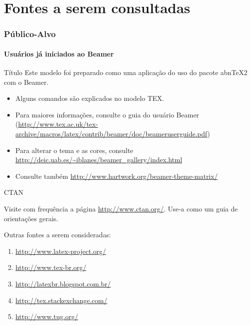 \documentclass[aspectratio=169]{beamer}	 	%
\begin{document}
\section{Fontes a serem consultadas}
\begin{frame}
\frametitle{Público-Alvo}
\framesubtitle{Usuários já iniciados ao Beamer}

\begin{block}{Título}
 Este modelo foi preparado como uma aplicação do uso do pacote abnTeX2 com o Beamer.
\end{block}

\begin{itemize}
 \item Alguns comandos são explicados no modelo TEX. \pause
 \item Para maiores informações, consulte o guia do usuário Beamer (\url{http://www.tex.ac.uk/tex-archive/macros/latex/contrib/beamer/doc/beameruserguide.pdf})\pause
 \item Para alterar o tema e as cores, consulte \url{http://deic.uab.es/~iblanes/beamer_gallery/index.html}
 \item Consulte também \url{http://www.hartwork.org/beamer-theme-matrix/}
\end{itemize}

\end{frame}

\begin{frame}{CTAN}

Visite com frequência a página \url{http://www.ctan.org/}. Use-a como um guia de orientações gerais.
\vspace{0.7cm}

Outras fontes a serem consideradas:
\begin{enumerate}
 \item \url{http://www.latex-project.org/}
 \item \url{http://www.tex-br.org/}
 \item \url{http://latexbr.blogspot.com.br/}
 \item \url{http://tex.stackexchange.com/}
 \item \url{http://www.tug.org/}
\end{enumerate}

\end{frame}
\end{document}
